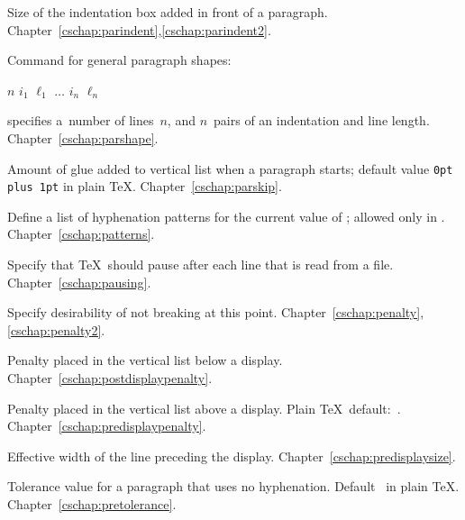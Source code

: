 \begin{glossinventory}
\item [\cs{parindent}]
      Size of the indentation box added in front of a paragraph.
Chapter~\ref{cschap:parindent},\ref{cschap:parindent2}.

\item [\cs{parshape}]
      Command for general paragraph shapes: 
      \begin{disp}$n$ $i_1$ $\ell_1$ $\ldots$
                $i_n$ $\ell_n$\end{disp}
      specifies a~number
      of lines~$n$, and $n$~pairs of an indentation and
      line length.
Chapter~\ref{cschap:parshape}.

\item [\cs{parskip}]
      Amount of glue added to vertical list when a paragraph starts; 
      default value \verb.0pt plus 1pt. in plain \TeX.
Chapter~\ref{cschap:parskip}.

\item [\cs{patterns\gr{general text}}]
      Define a list of hyphenation patterns for the current
      value of ;  allowed only in \IniTeX.
Chapter~\ref{cschap:patterns}.

\item [\cs{pausing}]
      Specify that \TeX\ should pause after each line that is 
      read from a file.
Chapter~\ref{cschap:pausing}.

\item [\cs{penalty}]
      Specify desirability of not breaking at this point.
Chapter~\ref{cschap:penalty},\ref{cschap:penalty2}.

\item [\cs{postdisplaypenalty}]
      Penalty placed in the vertical list below a display.
Chapter~\ref{cschap:postdisplaypenalty}.

\item [\cs{predisplaypenalty}]
      Penalty placed in the vertical list above a display.
      Plain \TeX\ default:~.
Chapter~\ref{cschap:predisplaypenalty}.

\item [\cs{predisplaysize}]
      Effective width of the line preceding the display.
Chapter~\ref{cschap:predisplaysize}.

\item [\cs{pretolerance}]
      Tolerance value for a paragraph that uses no hyphenation. 
      Default~ in plain \TeX.
Chapter~\ref{cschap:pretolerance}.


\end{glossinventory}
